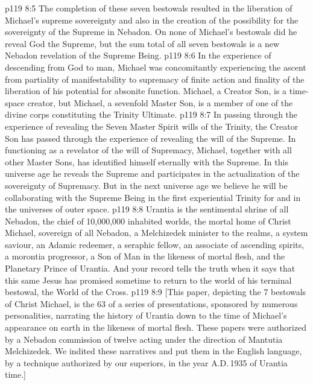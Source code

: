 \vs p119 8:5 The completion of these seven bestowals resulted in the liberation of Michael’s supreme sovereignty and also in the creation of the possibility for the sovereignty of the Supreme in Nebadon. On none of Michael’s bestowals did he reveal God the Supreme, but the sum total of all seven bestowals is a new Nebadon revelation of the Supreme Being.
\vs p119 8:6 In the experience of descending from God to man, Michael was concomitantly experiencing the ascent from partiality of manifestability to supremacy of finite action and finality of the liberation of his potential for absonite function. Michael, a Creator Son, is a time\hyp{}space creator, but Michael, a sevenfold Master Son, is a member of one of the divine corps constituting the Trinity Ultimate.
\vs p119 8:7 In passing through the experience of revealing the Seven Master Spirit wills of the Trinity, the Creator Son has passed through the experience of revealing the will of the Supreme. In functioning as a revelator of the will of Supremacy, Michael, together with all other Master Sons, has identified himself eternally with the Supreme. In this universe age he reveals the Supreme and participates in the actualization of the sovereignty of Supremacy. But in the next universe age we believe he will be collaborating with the Supreme Being in the first experiential Trinity for and in the universes of outer space.
\vs p119 8:8 \pc Urantia is the sentimental shrine of all Nebadon, the chief of 10,000,000 inhabited worlds, the mortal home of Christ Michael, sovereign of all Nebadon, a Melchizedek minister to the realms, a system saviour, an Adamic redeemer, a seraphic fellow, an associate of ascending spirits, a morontia progressor, a Son of Man in the likeness of mortal flesh, and the Planetary Prince of Urantia. And your record tells the truth when it says that this same Jesus has promised sometime to return to the world of his terminal bestowal, the World of the Cross.
\vsetoff
\vs p119 8:9 [This paper, depicting the 7 bestowals of Christ Michael, is the 63 of a series of presentations, sponsored by numerous personalities, narrating the history of Urantia down to the time of Michael’s appearance on earth in the likeness of mortal flesh. These papers were authorized by a Nebadon commission of twelve acting under the direction of Mantutia Melchizedek. We indited these narratives and put them in the English language, by a technique authorized by our superiors, in the year A.D.\,1935 of Urantia time.]
\quizlink
